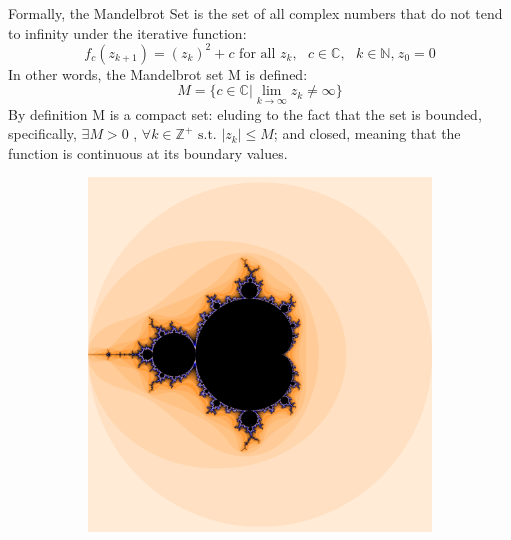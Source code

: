 \documentclass[a4paper]{article}
\begin{document}
Formally, the Mandelbrot Set is the set of all complex numbers that do not tend to infinity under the iterative function:
\begin{equation}
f_{c}(z_{k+1}) = (z_{k})^2 + c \mbox{ for all }  z_{k}, \mbox{ $c$} \in \mathbb{C}, \mbox{ $k$} \in \mathbb{N}, \hspace{1pt} z_{0} = 0
\end{equation}
In other words, the Mandelbrot set M is defined:
\[M=\{c \in \mathbb{C} | \lim_{k \to \infty} z_{k} \neq \infty\}\]
By definition M is a compact set: eluding to the fact that the set is bounded, specifically, $\exists M>0$ , $\forall k \in \mathbb{Z^+} \mbox{ s.t. } \left|z_{k}\right|\leq M$; and closed, meaning that the function is continuous at its boundary values.

\begin{figure}[h]
    \centering
    \begin{subfigure}[h]{0.45\textwidth}
        \includegraphics[width=\textwidth]{Morange}
    \end{subfigure}%
    ~ %
    \begin{subfigure}[h]{0.45\textwidth}

\end{subfigure}
\end{figure}
\end{document}
